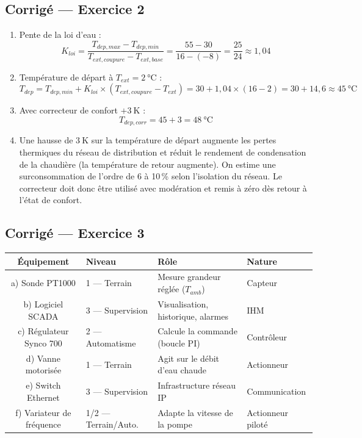 \subsection*{Corrigé — Exercice 2}

\begin{enumerate}
  \item Pente de la loi d'eau :
  \[
    K_{loi} = \frac{T_{dep,max} - T_{dep,min}}{T_{ext,coupure} - T_{ext,base}} = \frac{55 - 30}{16 - (-8)} = \frac{25}{24} \approx \boxed{1{,}04}
  \]

  \item Température de départ à $T_{ext} = \SI{2}{\celsius}$ :
  \[
    T_{dep} = T_{dep,min} + K_{loi} \times (T_{ext,coupure} - T_{ext}) = 30 + 1{,}04 \times (16 - 2) = 30 + 14{,}6 \approx \boxed{\SI{45}{\celsius}}
  \]

  \item Avec correcteur de confort $+\SI{3}{\kelvin}$ :
  \[
    T_{dep,corr} = 45 + 3 = \boxed{\SI{48}{\celsius}}
  \]

  \item Une hausse de $\SI{3}{\kelvin}$ sur la température de départ augmente les pertes thermiques du réseau de distribution et réduit le rendement de condensation de la chaudière (la température de retour augmente). On estime une surconsommation de l'ordre de 6 à 10\,\% selon l'isolation du réseau. Le correcteur doit donc être utilisé avec modération et remis à zéro dès retour à l'état de confort.
\end{enumerate}

\subsection*{Corrigé — Exercice 3}

\begin{center}
\begin{tabular}{clll}
  \toprule
  Équipement & Niveau & Rôle & Nature \\
  \midrule
  a) Sonde PT1000 & 1 — Terrain & Mesure grandeur réglée ($T_{amb}$) & Capteur \\
  b) Logiciel SCADA & 3 — Supervision & Visualisation, historique, alarmes & IHM \\
  c) Régulateur Synco 700 & 2 — Automatisme & Calcule la commande (boucle PI) & Contrôleur \\
  d) Vanne motorisée & 1 — Terrain & Agit sur le débit d'eau chaude & Actionneur \\
  e) Switch Ethernet & 3 — Supervision & Infrastructure réseau IP & Communication \\
  f) Variateur de fréquence & 1/2 — Terrain/Auto. & Adapte la vitesse de la pompe & Actionneur piloté \\
  \bottomrule
\end{tabular}
\end{center}

